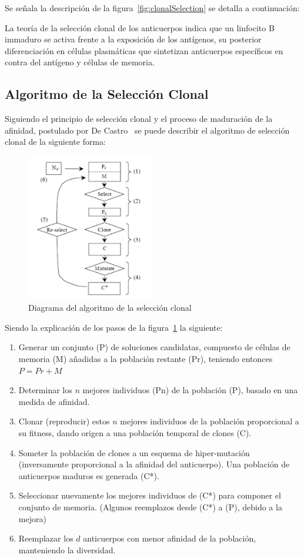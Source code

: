 Se señala la descripción de la figura~\ref{fig:clonalSelection} se detalla a continuación:

La teoría de la selección clonal de los anticuerpos indica que un linfocito B immaduro
se activa frente a la exposición de los antígenos, su posterior diferenciación en células
plasmáticas que sintetizan anticuerpos específicos en contra del antígeno y células de memoria.


\subsection{Algoritmo de la Selección Clonal}

Siguiendo el principio de selección clonal y el proceso de maduración de la afinidad, postulado por De Castro~\cite{decastro} se puede describir el algoritmo de selección clonal de la siguiente forma:
\begin{figure}[h!]
\begin{center}
\includegraphics[width=0.5\textwidth]{img/algoritmo}
\end{center}
\caption{Diagrama del algoritmo de la selección clonal}
\label{fig:algoritmo}
\end{figure}

Siendo la explicación de los pasos de la figura~\ref{fig:algoritmo} la siguiente:
\begin{enumerate}
    \item Generar un conjunto (P) de soluciones candidatas, compuesto de células de memoria (M) añadidas a la población restante (Pr), teniendo entonces $P = Pr + M$
    \item Determinar los $n$ mejores individuos (Pn) de la población (P), basado en una medida de afinidad.
    \item Clonar (reproducir) estos $n$ mejores individuos de la población proporcional a su fitness, dando origen a una población temporal de clones (C).
    \item Someter la población de clones a un esquema de hiper-mutación (inversamente proporcional a la afinidad del anticuerpo). Una población de anticuerpos maduros es generada (C*).
    \item Seleccionar nuevamente los mejores individuos de (C*) para componer el conjunto de memoria. (Algunos reemplazos desde (C*) a (P), debido a la mejora)
    \item Reemplazar los $d$ anticuerpos con menor afinidad de la población, manteniendo la diversidad.
\end{enumerate}

